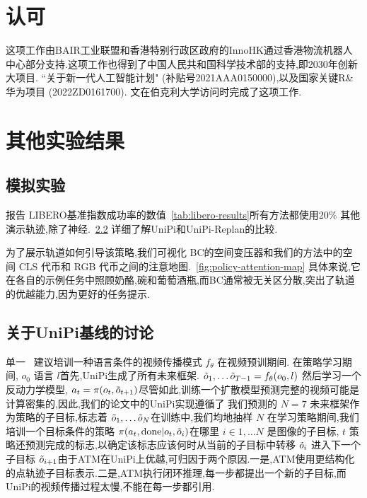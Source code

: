\documentclass[conference]{IEEEtran}
\begin{document}
\section{认可}
这项工作由BAIR工业联盟和香港特别行政区政府的InnoHK通过香港物流机器人中心部分支持.这项工作也得到了中国人民共和国科学技术部的支持,即2030年创新大项目. ``关于新一代人工智能计划" (补贴号2021AAA0150000),以及国家关键R\&华为项目 (2022ZD0161700). 文在伯克利大学访问时完成了这项工作.






\clearpage
\appendices
\section{其他实验结果}

\subsection{模拟实验}

报告 LIBERO基准指数成功率的数值~\ref{tab:libero-results}所有方法都使用20$\%$ 其他演示轨迹,除了神经.~\ref{sec:app:unipi} 详细了解UniPi和UniPi-Replan的比较.

为了展示轨道如何引导该策略,我们可视化 BC的空间变压器和我们的方法中的空间 CLS 代币和 RGB 代币之间的注意地图.~\ref{fig:policy-attention-map} 具体来说,它在各自的示例任务中照顾奶酪,碗和葡萄酒瓶,而BC通常被无关区分散,突出了轨道的优越能力,因为更好的任务提示.


\subsection{关于UniPi基线的讨论}\label{sec:app:unipi}

单一~\cite{du2023unipi} 建议培训一种语言条件的视频传播模式 $f_\theta$ 在视频预训期间. 在策略学习期间, $o_0$ 语言 $l$首先,UniPi生成了所有未来框架. $\Tilde{o}_1, \dots \Tilde{o}_{T-1} = f_\theta (o_0, l)$ 然后学习一个反动力学模型, $a_t = \pi(o_t, \Tilde{o}_{t+1})$尽管如此,训练一个扩散模型预测完整的视频可能是计算密集的,因此,我们的论文中的UniPi实现遵循了 \citet{Ko2023Learning}我们预测的 $N=7$ 未来框架作为策略的子目标,标志着 $\Tilde{o}_1, \dots \Tilde{o}_N$在训练中,我们均地抽样 $N$ 在学习策略期间,我们培训一个目标条件的策略 $\pi(a_t, \text{done} | o_t, \Tilde{o}_{i})$在哪里 $i\in {1, \dots N}$ 是图像的子目标, $t$ 策略还预测完成的标志,以确定该标志应该何时从当前的子目标中转移 $\Tilde{o}_i$ 进入下一个子目标 $\Tilde{o}_{i+1}$由于ATM在UniPi上优越,可归因于两个原因.一是,ATM使用更结构化的点轨迹子目标表示.二是,ATM执行闭环推理,每一步都提出一个新的子目标,而UniPi的视频传播过程太慢,不能在每一步都引用. 
\end{document}
